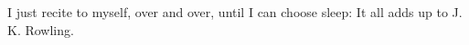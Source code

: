 I just recite to myself, over and over, until I can choose sleep: It all adds up to J. K. Rowling.

